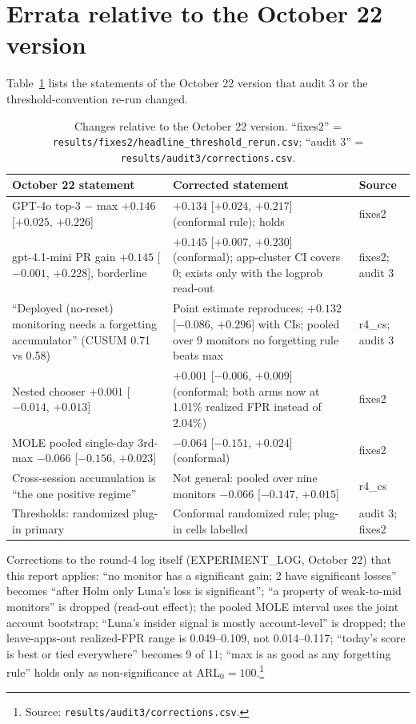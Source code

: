 \documentclass[11pt]{article}
\newcommand{\m}{\ensuremath{-}}
\newcommand{\src}[1]{\footnote{Source: \nolinkurl{#1}.}}
\begin{document}
\section{Errata relative to the October 22 version}
Table~\ref{tab:errata22} lists the statements of the October 22 version that audit 3 or the threshold-convention re-run changed.
\begin{table}[!htbp]\centering\small
\begin{tabularx}{\linewidth}{@{}>{\raggedright\arraybackslash}p{5.2cm}>{\raggedright\arraybackslash}X>{\raggedright\arraybackslash}p{2.7cm}@{}}
\toprule
October 22 statement & Corrected statement & Source\\
\midrule
GPT-4o top-3 $-$ max $+0.146$ [$+0.025$, $+0.226$] & $+0.134$ [$+0.024$, $+0.217$] (conformal rule); holds & fixes2\\
gpt-4.1-mini PR gain $+0.145$ [$\m0.001$, $+0.228$], borderline & $+0.145$ [$+0.007$, $+0.230$] (conformal); app-cluster CI covers 0; exists only with the logprob read-out & fixes2; audit 3\\
``Deployed (no-reset) monitoring needs a forgetting accumulator'' (CUSUM 0.71 vs 0.58) & Point estimate reproduces; $+0.132$ [$\m0.086$, $+0.296]$ with CIs; pooled over 9 monitors no forgetting rule beats max & r4\_cs; audit 3\\
Nested chooser $+0.001$ [$\m0.014$, $+0.013$] & $+0.001$ [$\m0.006$, $+0.009$] (conformal; both arms now at 1.01\% realized FPR instead of 2.04\%) & fixes2\\
MOLE pooled single-day 3rd-max $\m0.066$ [$\m0.156$, $+0.023$] & $\m0.064$ [$\m0.151$, $+0.024$] (conformal) & fixes2\\
Cross-session accumulation is ``the one positive regime'' & Not general: pooled over nine monitors $\m0.066$ [$\m0.147$, $+0.015$] & r4\_cs\\
Thresholds: randomized plug-in primary & Conformal randomized rule; plug-in cells labelled & audit 3; fixes2\\
\bottomrule
\end{tabularx}
\caption{Changes relative to the October 22 version. ``fixes2'' = \nolinkurl{results/fixes2/headline_threshold_rerun.csv}; ``audit 3'' = \nolinkurl{results/audit3/corrections.csv}.}\label{tab:errata22}
\end{table}

Corrections to the round-4 log itself (EXPERIMENT\_LOG, October 22) that this report applies: ``no monitor has a significant gain; 2 have significant losses'' becomes ``after Holm only Luna's loss is significant''; ``a property of weak-to-mid monitors'' is dropped (read-out effect); the pooled MOLE interval uses the joint account bootstrap; ``Luna's insider signal is mostly account-level'' is dropped; the leave-apps-out realized-FPR range is 0.049--0.109, not 0.014--0.117; ``today's score is best or tied everywhere'' becomes 9 of 11; ``max is as good as any forgetting rule'' holds only as non-significance at ARL$_0=100$.\src{results/audit3/corrections.csv}
\end{document}
